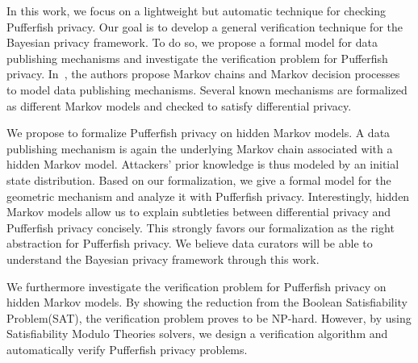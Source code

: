 
In this work, we focus on a lightweight but automatic technique for
checking Pufferfish privacy. Our goal is to develop a general
verification technique for the Bayesian privacy framework. To do so,
we propose a formal model for data publishing mechanisms and
investigate the verification problem for Pufferfish privacy.
In~\cite{LWZ:18:MCDPP}, the authors propose Markov chains and Markov
decision processes to model data publishing mechanisms. Several known
mechanisms are formalized as different Markov models and checked to
satisfy differential privacy.

We propose to formalize Pufferfish privacy on hidden Markov models. A
data publishing mechanism is again the underlying Markov
chain associated with a hidden Markov model. Attackers' prior
knowledge is thus modeled by an initial state distribution. Based on
our formalization, we give a formal model for the geometric mechanism
and analyze it with Pufferfish privacy. Interestingly, hidden Markov
models allow us to explain subtleties between differential privacy and
Pufferfish privacy concisely. This strongly favors our formalization
as the right abstraction for Pufferfish privacy. We believe data
curators will be able to understand the Bayesian privacy framework
through this work.

We furthermore investigate the verification problem for Pufferfish
privacy on hidden Markov models. By showing the reduction from the 
Boolean Satisfiability Problem(SAT), the verification problem proves
to be NP-hard. However, by using Satisfiability Modulo Theories solvers,
we design a verification algorithm and automatically verify Pufferfish
privacy problems.


